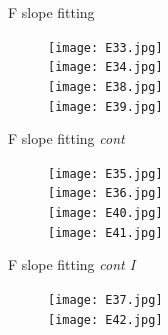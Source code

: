 \documentclass[t,12pt,english
\ifx\beamermode\undefined\else,\beamermode\fi
]{beamer}
\begin{document}
\begin{frame}{F slope fitting}
\begin{figure}[!htbp]
%
\centering
\texttt{[image: E33.jpg]}\\
\texttt{[image: E34.jpg]}\\
\endminipage\hfill
{}%
\centering
\texttt{[image: E38.jpg]}\\
\texttt{[image: E39.jpg]}\\
\endminipage\hfill
\end{figure}
\end{frame}

\begin{frame}{F slope fitting \textit{cont}}
\begin{figure}[!htbp]
%
\centering
\texttt{[image: E35.jpg]}\\
\texttt{[image: E36.jpg]}\\
\endminipage\hfill
{}%
\centering
\texttt{[image: E40.jpg]}\\
\texttt{[image: E41.jpg]}\\
\endminipage\hfill
\end{figure}
\end{frame}

\begin{frame}{F slope fitting \textit{cont I}}
\begin{figure}[!htbp]
%
\centering
\texttt{[image: E37.jpg]}\\
\endminipage\hfill
{}%
\centering
\texttt{[image: E42.jpg]}\\
\endminipage\hfill
\end{figure}
\end{frame}
\end{document}
